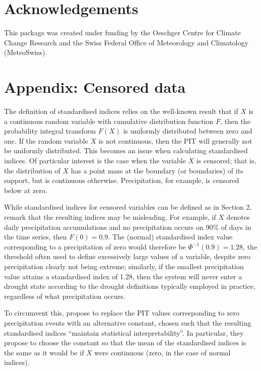 \section{Acknowledgements}\label{acknowledgements}

This package was created under funding by the Oeschger Centre for Climate Change Research and the Swiss Federal Office of Meteorology and Climatology (MeteoSwiss).

\section{Appendix: Censored data}\label{appendix-censored-data}

The definition of standardised indices relies on the well-known result that if \(X\) is a continuous random variable with cumulative distribution function \(F\), then the probability integral transform \(F(X)\) is uniformly distributed between zero and one. If the random variable \(X\) is not continuous, then the PIT will generally not be uniformly distributed. This becomes an issue when calculating standardised indices. Of particular interest is the case when the variable \(X\) is censored; that is, the distribution of \(X\) has a point mass at the boundary (or boundaries) of its support, but is continuous otherwise. Precipitation, for example, is censored below at zero.

While standardised indices for censored variables can be defined as in Section 2, \cite{StaggeEtAl2015} remark that the resulting indices may be misleading. For example, if \(X\) denotes daily precipitation accumulations and no precipitation occurs on 90\% of days in the time series, then \(F(0) = 0.9\). The (normal) standardised index value corresponding to a precipitation of zero would therefore be \(\Phi^{-1}(0.9) = 1.28\), the threshold often used to define excessively large values of a variable, despite zero precipitation clearly not being extreme; similarly, if the smallest precipitation value attains a standardised index of 1.28, then the system will never enter a drought state according to the drought definitions typically employed in practice, regardless of what precipitation occurs.

To circumvent this, \cite{StaggeEtAl2015} propose to replace the PIT values corresponding to zero precipitation events with an alternative constant, chosen such that the resulting standardised indices ``maintain statistical interpretability''. In particular, they propose to choose the constant so that the mean of the standardised indices is the same as it would be if \(X\) were continuous (zero, in the case of normal indices).


